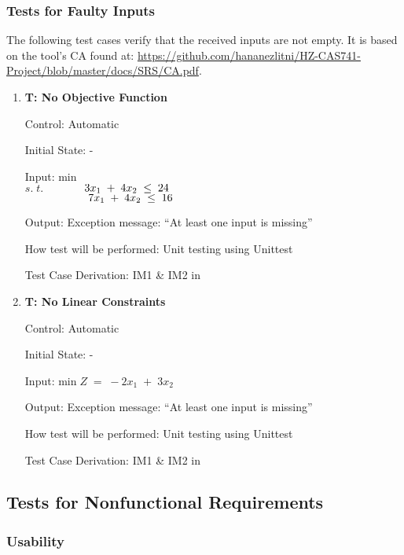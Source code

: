 \documentclass[12pt, titlepage]{article}
\newcounter{testnum} %
\begin{document}
\subsubsection{Tests for Faulty Inputs} \label{TestInputs}

The following test cases verify that the received inputs are not empty. It is 
based on the tool's CA found at: 
\url{https://github.com/hananezlitni/HZ-CAS741-Project/blob/master/docs/SRS/CA.pdf}.\\

\begin{enumerate}
	\item{\textbf{T\thetestnum \label{NoObjcFunc}: No 
	Objective Function}}
	
	Control: Automatic 
	
	Initial State: -
	
	Input: min \\
	$s.\;t.$$\hspace*{1.3cm} 3x_1\;+\;4x_2\; \leq \;24$\\
	$\hspace*{2cm} 7x_1\;+\;4x_2\; \leq \;16$
	
	Output: Exception message: ``At least one input is missing''
	
	How test will be performed: Unit testing using Unittest
	
	Test Case Derivation: IM1 \& IM2 in \cite{losms-ca}
	
	\item{\textbf{T\thetestnum \label{NoLCs}: No 
			Linear Constraints}}
	
	Control: Automatic 
	
	Initial State: -
	
	Input: min$\;Z\;=\;-2x_1\;+\;3x_2$
	
	Output: Exception message: ``At least one input is missing''
	
	How test will be performed: Unit testing using Unittest
	
	Test Case Derivation: IM1 \& IM2 in \cite{losms-ca}
\end{enumerate}


\subsection{Tests for Nonfunctional Requirements} \label{NonFunctionalTests}

\subsubsection{Usability}
\end{document}
